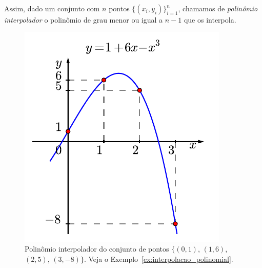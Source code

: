 Assim, dado um conjunto com $n$ pontos $\{(x_i,y_i)\}_{i=1}^{n}$, chamamos de \emph{polinômio interpolador} o polinômio de grau menor ou igual a $n-1$ que os interpola.


\begin{figure}[ht]
  \centering
  \includegraphics{./cap_interp/pics/ex_interpolacao_polinomial/ex_interpolacao_polinomial}
  \caption{Polinômio interpolador do conjunto de pontos $\{(0, 1)$, $(1, 6)$, $(2, 5)$, $(3, -8)\}$. Veja o Exemplo~\ref{ex:interpolacao_polinomial}.}\label{fig:ex_interpolacao_polinomial}
\end{figure}

